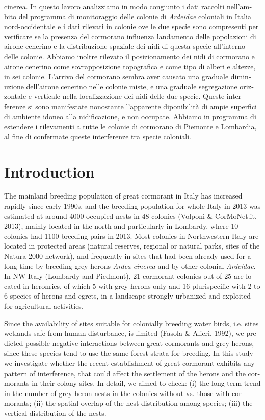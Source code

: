 \begin{otherlanguage}{english}
{{cinerea}. In questo lavoro analizziamo in modo congiunto i dati
raccolti nell{\textquoteright}ambito del programma di monitoraggio
delle colonie di \textit{Ardeidae} coloniali in Italia nord-occidentale
e i dati rilevati in colonie ove le due specie sono compresenti per
verificare se la presenza del cormorano influenza
l{\textquotesingle}andamento delle popolazioni di airone cenerino e la
distribuzione spaziale dei nidi di questa specie
all{\textquoteright}interno delle colonie. Abbiamo inoltre rilevato il
posizionamento dei nidi di cormorano e airone cenerino come
sovrapposizione topografica e come tipo di alberi e altezze, in sei
colonie. L{\textquoteright}arrivo del cormorano sembra aver causato una
graduale diminuzione dell{\textquoteright}airone cenerino nelle colonie
miste, e una graduale segregazione orizzontale e verticale nella
localizzazione dei nidi delle due specie. Queste interferenze si sono
manifestate nonostante l{\textquoteright}apparente diponibilit\`a di
ampie superfici di ambiente idoneo alla nidificazione, e non occupate.
Abbiamo in programma di estendere i rilevamenti a tutte le colonie di
cormorano di Piemonte e Lombardia, al fine di confermate queste
interferenze tra specie coloniali. \\
}



\section*{Introduction}
The mainland breeding population of great cormorant in Italy has
increased rapidly since early 1990s, and the breeding population for
whole Italy in 2013 was estimated at around 4000 occupied nests in 48
colonies (Volponi \& CorMoNet.it, 2013), mainly located in the north
and particularly in Lombardy, where 10 colonies had 1100 breeding pairs
in 2013. Most colonies in Northwestern Italy are located in protected
areas (natural reserves, regional or natural parks, sites of the Natura
2000 network), and frequently in sites that had been already used for a
long time by breeding grey herons \textit{Ardea cinerea} and by other
colonial \textit{Ardeidae}. In NW Italy (Lombardy and Piedmont), 21
cormorant colonies out of 25 are located in heronries, of which 5 with
grey herons only and 16 plurispecific with 2 to 6 species of herons and
egrets, in a landscape strongly urbanized and exploited for
agricultural activities.

Since the availability of sites suitable for colonially breeding water
birds, i.e. sites wetlands safe from human disturbance, is limited
(Fasola \& Alieri, 1992), we predicted possible negative interactions
between great cormorants and grey herons, since these species tend to
use the same forest strata for breeding. In this study we investigate
whether the recent establishment of great cormorant exhibits any
pattern of interference, that could affect the settlement of the herons
and the cormorants in their colony sites. In detail, we aimed to check:
(i) the long-term trend in the number of grey heron nests in the
colonies without vs. those with cormorants; (ii) the spatial overlap of
the nest distribution among species; (iii) the vertical distribution of
the nests.


\end{otherlanguage}
